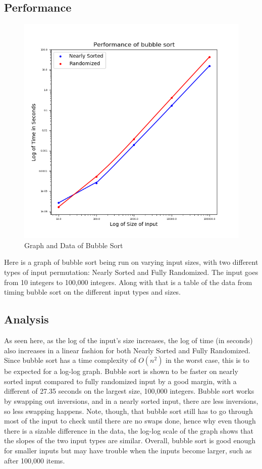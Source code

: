 \documentclass{article}
\begin{document}
\subsection{Performance}
    \begin{figure}[H]
        \centering
        \includegraphics[scale=0.60]{"../images/bubble"}
        \caption{Graph and Data of Bubble Sort}
    \end{figure}
    Here is a graph of bubble sort being run on varying input sizes, with two
    different types of input permutation: Nearly Sorted and Fully Randomized.
    The input goes from 10 integers to 100,000 integers. Along with that is
    a table of the data from timing bubble sort on the different input types and
    sizes.
\subsection{Analysis}
    As seen here, as the log of the input's size increases, the log of time 
    (in seconds) also increases in a linear fashion for both Nearly Sorted and
    Fully Randomized. Since bubble sort has a time complexity of $O(n^2)$ in
    the worst case, this is to be expected for a log-log graph. 
    \nextblurb
    Bubble sort is shown to be faster on nearly sorted input compared to fully 
    randomized input by a good margin, with a different of 27.35 seconds on 
    the largest size, 100,000 integers. Bubble sort works by swapping out 
    inversions, and in a nearly sorted input, there are less inversions, so less 
    swapping happens. Note, though, that bubble sort still has to go through 
    most of the input to check until there are no swaps done, hence why even 
    though there is a sizable difference in the data, the log-log scale of the 
    graph shows that the slopes of the two input types are similar.
    \nextblurb 
    Overall, bubble sort is good enough for smaller inputs but may have trouble
    when the inputs become larger, such as after 100,000 items.
\end{document}
